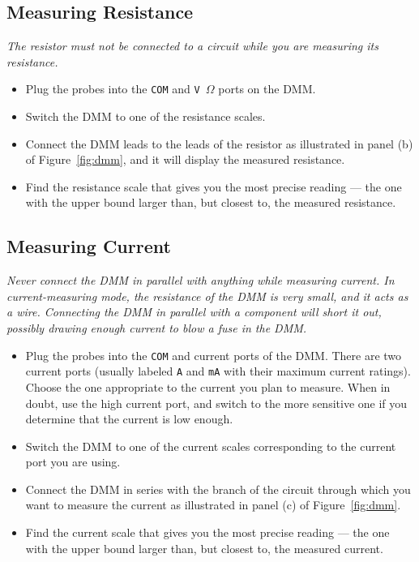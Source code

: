 \documentclass[11pt]{article}
\begin{document}
\subsection{Measuring Resistance}

\emph{The resistor must not be connected to a circuit while you are
  measuring its resistance.}

\begin{itemize}
\item Plug the probes into the \texttt{COM} and \texttt{V\,$\Omega$}
  ports on the DMM.

\item Switch the DMM to one of the resistance scales.
  
\item Connect the DMM leads to the leads of the resistor as illustrated in
  panel (b) of Figure~\ref{fig:dmm}, and it will display the measured
  resistance.

\item Find the resistance scale that gives you the most
  precise reading --- the one with the upper bound larger than, but
  closest to, the measured resistance.
\end{itemize}

\subsection{Measuring Current}

\emph{Never connect the DMM in parallel with anything while measuring
  current. In current-measuring mode, the resistance of the DMM is
  very small, and it acts as a wire. Connecting the DMM in parallel
  with a component will short it out, possibly drawing enough current
  to blow a fuse in the DMM.}

\begin{itemize}
\item Plug the probes into the \texttt{COM} and current ports of the
  DMM. There are two current ports (usually labeled \texttt{A} and
  \texttt{mA} with their maximum current ratings). Choose the one
  appropriate to the current you plan to measure. When in doubt, use
  the high current port, and switch to the more sensitive one if you
  determine that the current is low enough.

\item Switch the DMM to one of the current scales corresponding to the
  current port you are using.

\item Connect the DMM in series with the branch of the circuit through
  which you want to measure the current as illustrated in panel (c) of
  Figure~\ref{fig:dmm}.
  
\item Find the current scale that gives you the most precise reading
  --- the one with the upper bound larger than, but closest to, the
  measured current.
\end{itemize}
\end{document}
